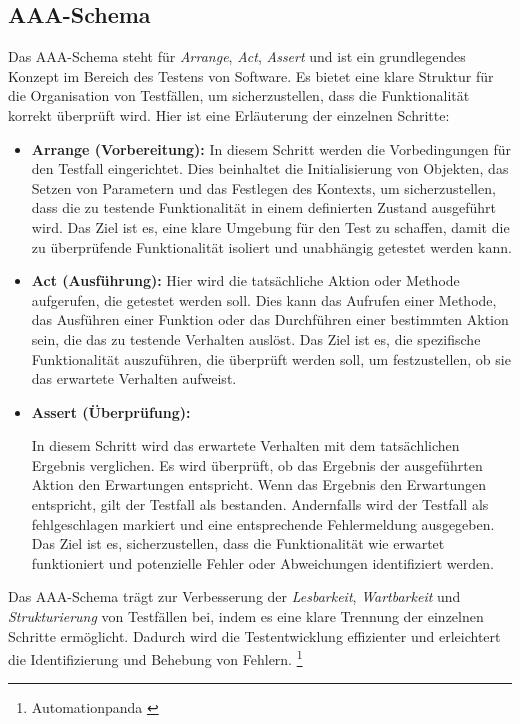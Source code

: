 \subsection{\label{sec:AAA}AAA-Schema}
Das AAA-Schema steht für \textit{Arrange}, \textit{Act}, \textit{Assert} und ist ein grundlegendes Konzept im Bereich des Testens von Software. Es bietet eine klare Struktur für die Organisation von Testfällen, um sicherzustellen, dass die Funktionalität korrekt überprüft wird. Hier ist eine Erläuterung der einzelnen Schritte:
\begin{itemize}
\item \textbf{Arrange (Vorbereitung):} In diesem Schritt werden die Vorbedingungen für den Testfall eingerichtet.
Dies beinhaltet die Initialisierung von Objekten, das Setzen von Parametern und das Festlegen des Kontexts, um sicherzustellen, dass die zu testende Funktionalität in einem definierten Zustand ausgeführt wird.
Das Ziel ist es, eine klare Umgebung für den Test zu schaffen, damit die zu überprüfende Funktionalität isoliert und unabhängig getestet werden kann.
\item \textbf{Act (Ausführung):}
Hier wird die tatsächliche Aktion oder Methode aufgerufen, die getestet werden soll.
Dies kann das Aufrufen einer Methode, das Ausführen einer Funktion oder das Durchführen einer bestimmten Aktion sein, die das zu testende Verhalten auslöst.
Das Ziel ist es, die spezifische Funktionalität auszuführen, die überprüft werden soll, um festzustellen, ob sie das erwartete Verhalten aufweist.
\item \textbf{Assert (Überprüfung):}

In diesem Schritt wird das erwartete Verhalten mit dem tatsächlichen Ergebnis verglichen.
Es wird überprüft, ob das Ergebnis der ausgeführten Aktion den Erwartungen entspricht.
Wenn das Ergebnis den Erwartungen entspricht, gilt der Testfall als bestanden. Andernfalls wird der Testfall als fehlgeschlagen markiert und eine entsprechende Fehlermeldung ausgegeben.
Das Ziel ist es, sicherzustellen, dass die Funktionalität wie erwartet funktioniert und potenzielle Fehler oder Abweichungen identifiziert werden.
\end{itemize}

Das AAA-Schema trägt zur Verbesserung der \textit{Lesbarkeit}, \textit{Wartbarkeit} und \textit{Strukturierung} von Testfällen bei, indem es eine klare Trennung der einzelnen Schritte ermöglicht. Dadurch wird die Testentwicklung effizienter und erleichtert die Identifizierung und Behebung von
Fehlern. \footnote{Automationpanda \cite{Arrange Act Assert}}

